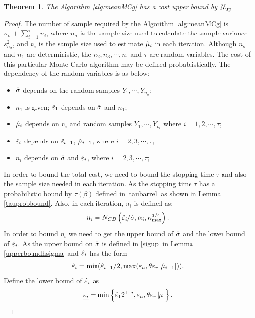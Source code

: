 \documentclass{iitthesis}
\newtheorem{theorem}{Theorem}[section]
\begin{document}
\label{sec:meanmcgcost}
\begin{theorem}
The Algorithm \ref{alg:meanMCg} has a cost upper bound by $N_{\operatorname{up}}$
\end{theorem}
\begin{proof}
The number of sample required by the Algorithm \ref{alg:meanMCg} is $n_{\sigma}+\sum_{i=1}^\tau n_i$, where $n_\sigma$ is the sample size used to calculate the sample variance $s_{n_\sigma}^2$, and $n_i$ is the sample size used to estimate $\hat{\mu}_i$ in each iteration.
 Although $n_{\sigma}$ and $n_1$ are deterministic, the $n_2, n_3,\cdots, n_\tau$ and $\tau$ are random variables. The cost of this particular Monte Carlo algorithm may be defined probablistically. The dependency of the random variables is as below:
 \begin{itemize}
 \item $\hat{\sigma}$ depends on the random samples $Y_1,\cdots, Y_{n_\sigma}$;
 \item $n_1$ is given; $\hat{\varepsilon}_1$ depends on $\hat{\sigma}$ and $n_1$; 
  \item $\hat{\mu}_i$ depends on $n_i$ and random samples $Y_1, \cdots, Y_{n_i}$ where $i = 1,2,\cdots,\tau$;
 \item $\hat{\varepsilon}_i$ depends on $\hat{\varepsilon}_{i-1}$, $\hat{\mu}_{i-1}$, where $i = 2,3,\cdots,\tau$;
 \item $n_i$ depends on  $\hat{\sigma}$ and $\hat{\varepsilon}_i$, where  $i = 2,3,\cdots,\tau$;
 \end{itemize}
 In order to bound the total cost, we need to bound the stopping time $\tau$ and also the sample size needed in each iteration. As the stopping time $\tau$ has a probabilistic bound by $\bar{\tau}(\beta)$ defined in \eqref{taubarrel} as shown in Lemma \eqref{tauprobbound}. Also, in each iteration, $n_i$ is defined as:
$$n_{i} = N_{CB}\left(\hat{\varepsilon}_{i}/\hat{\sigma},\alpha_{i},\kappa_{\max}^{3/4}\right).$$
In order to bound $n_i$ we need to get the upper bound of $\hat{\sigma}$ and the lower bound of $\hat{\varepsilon}_i$. As the upper bound on $\hat{\sigma}$ is defined in \eqref{sigup} in Lemma \ref{upperboundhsigma} and $\hat{\varepsilon}_i$ has the form
\begin{align}
\hat{\varepsilon}_i= \min(\hat{\varepsilon}_{i-1}/2, \max(\varepsilon_a,\theta\varepsilon_r\left \lvert \hat{\mu}_{i-1} \right \rvert)).
\end{align}
Define the lower bound of $\hat{\varepsilon}_i$ as
\begin{align}
  \underline{\varepsilon_i} = \min \left \{ \hat{\varepsilon}_12^{1-i},\varepsilon_a, \theta\varepsilon_r\left \lvert \mu \right \rvert \right \}.
\end{align}

\end{proof}
\end{document}
